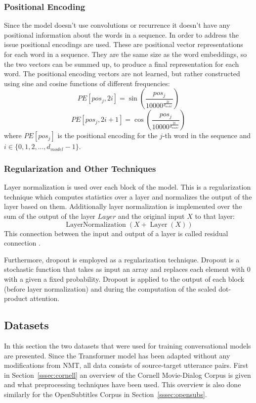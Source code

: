 \documentclass[12pt]{article}
\DeclareMathOperator{\Layer}{Layer}
\DeclareMathOperator{\LayerNormalization}{LayerNormalization}
\begin{document}
\subsubsection{Positional Encoding} \label{sssec:positional}
Since the model doesn't use convolutions or recurrence it doesn't have any positional information about the words in a sequence. In order to address the issue positional encodings are used. These are positional vector representations for each word in a sequence. They are the same size as the word embeddings, so the two vectors can be summed up, to produce a final representation for each word. The positional encoding vectors are not learned, but rather constructed using sine and cosine functions of different frequencies:
\begin{equation}
PE[pos_j,2i]=\sin\left(\frac{pos_j}{10000^{\frac{2i}{d_{model}}}}\right)
\end{equation}
\begin{equation}
PE[pos_j,2i+1]=\cos\left(\frac{pos_j}{10000^{\frac{2i}{d_{model}}}}\right) 
\end{equation}
where \(PE[pos_j]\) is the positional encoding for the \(j\)-th word in the sequence and \(i \in \{0,1,2,...,d_{model}-1\}\).

\subsubsection{Regularization and Other Techniques} \label{sssec:regularization}
Layer normalization \cite{Ba:2016} is used over each block of the model. This is a regularization technique which computes statistics over a layer and normalizes the output of the layer based on them. Additionally layer normalization is implemented over the sum of the output of the layer \(Layer\) and the original input \(X\) to that layer:
\begin{equation}
\LayerNormalization(X+\Layer(X))
\end{equation}
This connection between the input and output of a layer is called residual connection \cite{He:2016}.

Furthermore, dropout \cite{Dropout:2014} is employed as a regularization technique. Dropout is a stochastic function that takes as input an array and replaces each element with 0 with a given a fixed probability. Dropout is applied to the output of each block (before layer normalization) and during the computation of the scaled dot-product attention. 

\subsection{Datasets} \label{ssec:42}
In this section the two datasets that were used for training conversational models are presented. Since the Transformer model has been adapted without any modifications from NMT, all data consists of source-target utterance pairs. First in Section~\ref{sssec:cornell} an overview of the Cornell Movie-Dialog Corpus \cite{Danescu:2011} is given and what preprocessing techniques have been used. This overview is also done similarly for the OpenSubtitles Corpus \cite{Tiedemann:2009} in Section~\ref{sssec:opensubs}.
\end{document}
